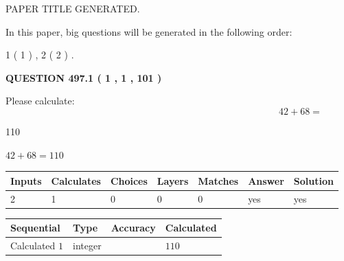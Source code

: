 \documentclass[12pt]{article}
\begin{document}
   
 PAPER TITLE GENERATED.
   
   
   
\vspace{0.2in}
   
In this paper, big questions will be generated in the following order: 
   
   
   1 ( 1 )
 ,
   2 ( 2 )
 .
  
\vspace{0.2in}
  
{\textbf{\Large{QUESTION
497.1 
 ( 1 , 1 , 101 )
}}}
  
  
 
Please calculate:
\begin{equation}
42 +  %
68 = \nonumber
\end{equation}
 
 
 
\noindent{}
 
 

110
 
 
\noindent{}
 
 

 
 
 
\noindent{}
 
 

$ %
42 +  %
68=   %
110$
 
 
\noindent{}
 
 

 
   
   
   
   
\noindent\begin{tabular}{|l|l|l|l|l|l|l|}
 \hline
Inputs & Calculates & Choices & Layers & Matches & Answer & Solution \\ \hline
 2  & 
 1  & 
 0
  & 
 0  & 
 0  & 
  yes & 
  yes 
  \\ \hline
 \end{tabular}
   
   
   
   
\noindent{}
   
   
  
  
\noindent\begin{tabular}{|l|l|l|l|}
\hline
 Sequential & Type & Accuracy & Calculated \\ 
\hline
 
 
  Calculated $  1 $ & integer &  & 
  $ 110 $ 
 \\  \hline  
 \end{tabular}
   
\end{document}
